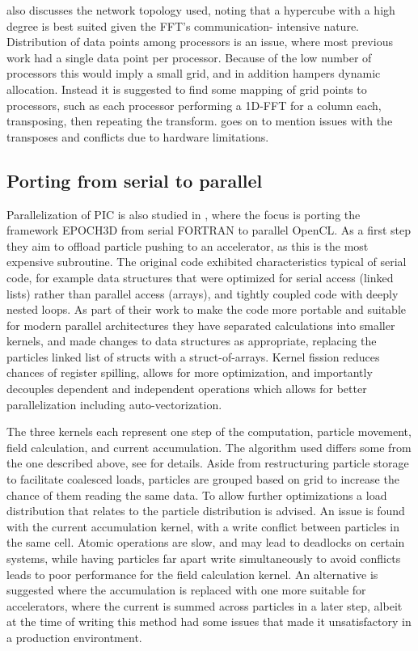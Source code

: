\documentclass[twocolumn]{article} %
\begin{document}
		\cite{elster94} also discusses
		the network topology used, noting that a hypercube with a high degree is best suited given the FFT's communication-
		intensive nature. Distribution of data points among processors is an issue, where most previous work had a single data
		point per processor. Because of the low number of processors this would imply a small grid, and in addition hampers
		dynamic allocation. Instead it is suggested to find some mapping of grid points to processors, such as each processor
		performing a 1D-FFT for a column each, transposing, then repeating the transform. \cite{elster94} goes on to mention
		issues with the transposes and conflicts due to hardware limitations.
		
		\subsection*{Porting from serial to parallel}
		Parallelization of PIC is also studied in \cite{bird13}, where the focus is porting the framework EPOCH3D from serial
		FORTRAN to parallel OpenCL. As a first step they aim to offload particle pushing to an accelerator, as this is the most
		expensive subroutine. The original code exhibited characteristics typical of serial code, for example data structures
		that were optimized for serial access (linked lists) rather than parallel access (arrays), and tightly coupled code
		with deeply nested loops. As part of their work to make the code more portable and suitable for modern parallel
		architectures they have separated calculations into smaller kernels, and made changes to data structures as
		appropriate,	replacing the particles linked list of structs with a struct-of-arrays. Kernel fission reduces chances
		of register spilling, allows for more optimization, and importantly decouples dependent and independent operations
		which allows for better parallelization including auto-vectorization.
		
		The three kernels each represent one step of the computation, particle movement, field calculation, and current
		accumulation. The algorithm used differs some from the one described above, see \cite{bird13} for details. Aside from
		restructuring particle storage to facilitate coalesced loads, particles are grouped based on grid to increase the
		chance of them reading the same data. To allow further optimizations a load distribution that relates to the particle
		distribution is advised. An issue is found with the current accumulation kernel, with a write conflict between
		particles in the same cell. Atomic operations are slow, and may lead to deadlocks on certain systems, while having
		particles far apart write simultaneously to avoid conflicts leads to poor performance for the field calculation kernel.
		An alternative is suggested where the accumulation is replaced with one more suitable for accelerators, where the
		current is summed across particles in a later step, albeit at the time of writing this method had some issues that
		made it unsatisfactory in a production environtment.
		
\end{document}
